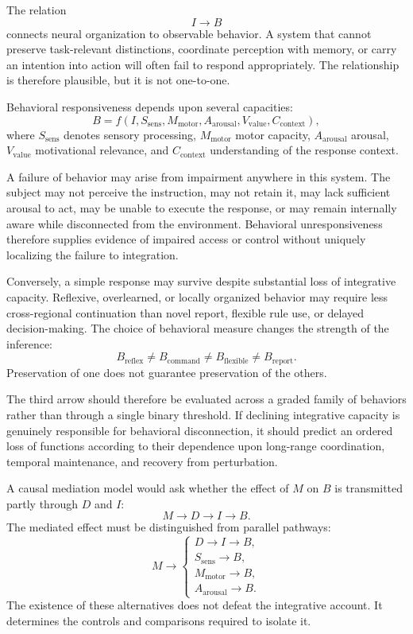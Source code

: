\documentclass[11pt]{book}
\begin{document}
The relation
\[
I\longrightarrow B
\]
connects neural organization to observable behavior. A system that cannot preserve task-relevant distinctions, coordinate perception with memory, or carry an intention into action will often fail to respond appropriately. The relationship is therefore plausible, but it is not one-to-one.

Behavioral responsiveness depends upon several capacities:
\[
B
=
f(I,S_{\mathrm{sens}},M_{\mathrm{motor}},A_{\mathrm{arousal}},
V_{\mathrm{value}},C_{\mathrm{context}}),
\]
where $S_{\mathrm{sens}}$ denotes sensory processing, $M_{\mathrm{motor}}$ motor capacity, $A_{\mathrm{arousal}}$ arousal, $V_{\mathrm{value}}$ motivational relevance, and $C_{\mathrm{context}}$ understanding of the response context.

A failure of behavior may arise from impairment anywhere in this system. The subject may not perceive the instruction, may not retain it, may lack sufficient arousal to act, may be unable to execute the response, or may remain internally aware while disconnected from the environment. Behavioral unresponsiveness therefore supplies evidence of impaired access or control without uniquely localizing the failure to integration.

Conversely, a simple response may survive despite substantial loss of integrative capacity. Reflexive, overlearned, or locally organized behavior may require less cross-regional continuation than novel report, flexible rule use, or delayed decision-making. The choice of behavioral measure changes the strength of the inference:
\[
B_{\mathrm{reflex}}
\neq
B_{\mathrm{command}}
\neq
B_{\mathrm{flexible}}
\neq
B_{\mathrm{report}}.
\]
Preservation of one does not guarantee preservation of the others.

The third arrow should therefore be evaluated across a graded family of behaviors rather than through a single binary threshold. If declining integrative capacity is genuinely responsible for behavioral disconnection, it should predict an ordered loss of functions according to their dependence upon long-range coordination, temporal maintenance, and recovery from perturbation.

A causal mediation model would ask whether the effect of $M$ on $B$ is transmitted partly through $D$ and $I$:
\[
M\longrightarrow D\longrightarrow I\longrightarrow B.
\]
The mediated effect must be distinguished from parallel pathways:
\[
M\longrightarrow
\begin{cases}
D\longrightarrow I\longrightarrow B,\\
S_{\mathrm{sens}}\longrightarrow B,\\
M_{\mathrm{motor}}\longrightarrow B,\\
A_{\mathrm{arousal}}\longrightarrow B.
\end{cases}
\]
The existence of these alternatives does not defeat the integrative account. It determines the controls and comparisons required to isolate it.
\end{document}
